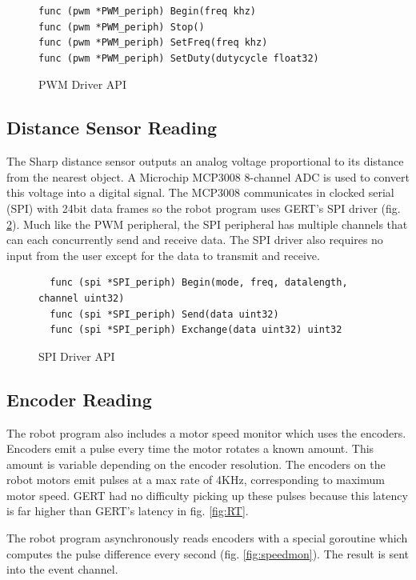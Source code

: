 \begin{figure}[h]
  \begin{lstlisting}
func (pwm *PWM_periph) Begin(freq khz)
func (pwm *PWM_periph) Stop()
func (pwm *PWM_periph) SetFreq(freq khz)
func (pwm *PWM_periph) SetDuty(dutycycle float32)
  \end{lstlisting}
  \caption{PWM Driver API} \label{fig:pwm_api}
\end{figure}

\subsection{Distance Sensor Reading}
The Sharp distance sensor outputs an analog voltage proportional to its distance from the nearest object.
A Microchip MCP3008 8-channel ADC is used to convert this voltage into a digital signal. The MCP3008 communicates in clocked
serial (SPI) with 24bit data frames so the robot program uses GERT's SPI driver (fig. \ref{fig:spi_api}). Much like the
PWM peripheral, the SPI peripheral has multiple channels that can each concurrently send and receive data. The SPI
driver also requires no input from the user except for the data to transmit and receive.

\begin{figure}[h]
  \begin{lstlisting}
  func (spi *SPI_periph) Begin(mode, freq, datalength, channel uint32)
  func (spi *SPI_periph) Send(data uint32)
  func (spi *SPI_periph) Exchange(data uint32) uint32
  \end{lstlisting}
  \caption{SPI Driver API} \label{fig:spi_api}
\end{figure}


\subsection{Encoder Reading}
The robot program also includes a motor speed monitor which uses the encoders.
Encoders emit a pulse every time the motor rotates a known amount. This amount is variable depending on the
encoder resolution. The encoders on the robot motors emit pulses at a max rate of 4KHz, corresponding to
maximum motor speed. GERT had no difficulty picking up these pulses because this latency is far higher than
GERT's latency in fig. \ref{fig:RT}.

The robot program asynchronously reads encoders with a special goroutine which computes the pulse difference
every second (fig. \ref{fig:speedmon}). The result is sent into the event channel.

